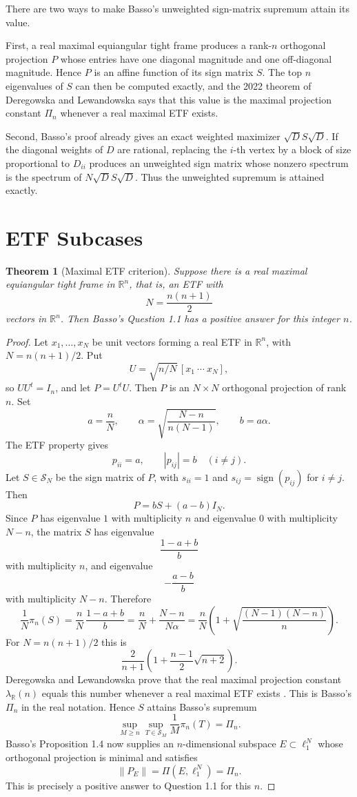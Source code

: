 \documentclass[11pt]{article}
\newtheorem{theorem}{Theorem}
\newcommand{\R}{\mathbb R}
\begin{document}
There are two ways to make Basso's unweighted sign-matrix supremum attain its
value.

First, a real maximal equiangular tight frame produces a rank-$n$ orthogonal
projection $P$ whose entries have one diagonal magnitude and one off-diagonal
magnitude.  Hence $P$ is an affine function of its sign matrix $S$.  The top
$n$ eigenvalues of $S$ can then be computed exactly, and the 2022 theorem of
Deregowska and Lewandowska says that this value is the maximal projection
constant $\Pi_n$ whenever a real maximal ETF exists.

Second, Basso's proof already gives an exact weighted maximizer
$\sqrt D S\sqrt D$.  If the diagonal weights of $D$ are rational, replacing
the $i$-th vertex by a block of size proportional to $D_{ii}$ produces an
unweighted sign matrix whose nonzero spectrum is the spectrum of
$N\sqrt D S\sqrt D$.  Thus the unweighted supremum is attained exactly.

\section*{ETF Subcases}

\begin{theorem}[Maximal ETF criterion]
Suppose there is a real maximal equiangular tight frame in $\R^n$, that is,
an ETF with
\[
  N=\frac{n(n+1)}{2}
\]
vectors in $\R^n$.  Then Basso's Question 1.1 has a positive answer for this
integer $n$.
\end{theorem}

\begin{proof}
Let $x_1,\ldots,x_N$ be unit vectors forming a real ETF in $\R^n$, with
$N=n(n+1)/2$.  Put
\[
  U=\sqrt{n/N}\,[x_1\ \cdots\ x_N],
\]
so $UU^t=I_n$, and let $P=U^tU$.  Then $P$ is an $N\times N$ orthogonal
projection of rank $n$.  Set
\[
  a=\frac{n}{N},\qquad
  \alpha=\sqrt{ \frac{N-n}{n(N-1)} },\qquad
  b=a\alpha.
\]
The ETF property gives
\[
  p_{ii}=a,\qquad |p_{ij}|=b\quad (i\neq j).
\]
Let $S\in\mathcal S_N$ be the sign matrix of $P$, with $s_{ii}=1$ and
$s_{ij}=\operatorname{sign}(p_{ij})$ for $i\neq j$.  Then
\[
  P=bS+(a-b)I_N.
\]
Since $P$ has eigenvalue $1$ with multiplicity $n$ and eigenvalue $0$ with
multiplicity $N-n$, the matrix $S$ has eigenvalue
\[
  \frac{1-a+b}{b}
\]
with multiplicity $n$, and eigenvalue
\[
  -\frac{a-b}{b}
\]
with multiplicity $N-n$.  Therefore
\[
  \frac{1}{N}\pi_n(S)
  =\frac{n}{N}\,\frac{1-a+b}{b}
  =\frac{n}{N}+\frac{N-n}{N\alpha}
  =\frac{n}{N}\left(1+\sqrt{\frac{(N-1)(N-n)}{n}}\right).
\]
For $N=n(n+1)/2$ this is
\[
  \frac{2}{n+1}\left(1+\frac{n-1}{2}\sqrt{n+2}\right).
\]
Deregowska and Lewandowska prove that the real maximal projection constant
$\lambda_{\R}(n)$ equals this number whenever a real maximal ETF exists
\cite[Theorem 2.5]{DeregowskaLewandowska2206}.  This is Basso's $\Pi_n$ in
the real notation.  Hence $S$ attains Basso's supremum
\[
  \sup_{M\geq n}\sup_{T\in\mathcal S_M}\frac{1}{M}\pi_n(T)=\Pi_n.
\]
Basso's Proposition 1.4 now supplies an $n$-dimensional subspace
$E\subset\ell_1^N$ whose orthogonal projection is minimal and satisfies
\[
  \|P_E\|=\Pi(E,\ell_1^N)=\Pi_n.
\]
This is precisely a positive answer to Question 1.1 for this $n$.
\end{proof}
\end{document}

